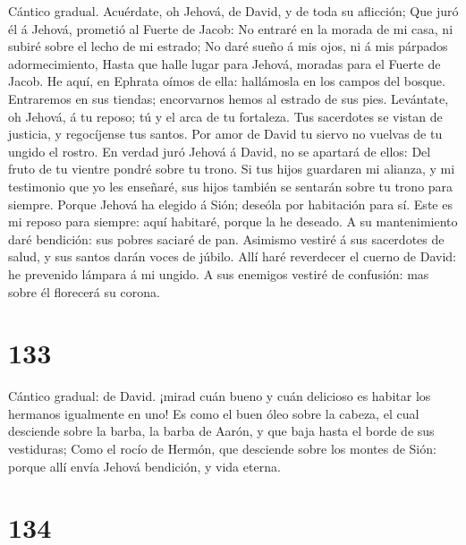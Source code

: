  Cántico gradual. Acuérdate, oh Jehová, de David, y de
toda su aflicción;  Que juró él á Jehová, prometió al
Fuerte de Jacob:  No entraré en la morada de mi casa, ni
subiré sobre el lecho de mi estrado;  No daré sueño á mis
ojos, ni á mis párpados adormecimiento,  Hasta que halle
lugar para Jehová, moradas para el Fuerte de Jacob.  He
aquí, en Ephrata oímos de ella: hallámosla en los campos del bosque.
 Entraremos en sus tiendas; encorvarnos hemos al estrado
de sus pies.  Levántate, oh Jehová, á tu reposo; tú y el
arca de tu fortaleza.  Tus sacerdotes se vistan de
justicia, y regocíjense tus santos.  Por amor de David tu
siervo no vuelvas de tu ungido el rostro.  En verdad juró
Jehová á David, no se apartará de ellos: Del fruto de tu vientre pondré
sobre tu trono.  Si tus hijos guardaren mi alianza, y mi
testimonio que yo les enseñaré, sus hijos también se sentarán sobre tu
trono para siempre.  Porque Jehová ha elegido á Sión;
deseóla por habitación para sí.  Este es mi reposo para
siempre: aquí habitaré, porque la he deseado.  A su
mantenimiento daré bendición: sus pobres saciaré de pan. 
Asimismo vestiré á sus sacerdotes de salud, y sus santos darán voces de
júbilo.  Allí haré reverdecer el cuerno de David: he
prevenido lámpara á mi ungido.  A sus enemigos vestiré de
confusión: mas sobre él florecerá su corona.

\hypertarget{section-132}{%
\section{133}\label{section-132}}

 Cántico gradual: de David. ¡mirad cuán bueno y cuán
delicioso es habitar los hermanos igualmente en uno!  Es
como el buen óleo sobre la cabeza, el cual desciende sobre la barba, la
barba de Aarón, y que baja hasta el borde de sus vestiduras;
 Como el rocío de Hermón, que desciende sobre los montes
de Sión: porque allí envía Jehová bendición, y vida eterna.

\hypertarget{section-133}{%
\section{134}\label{section-133}}

